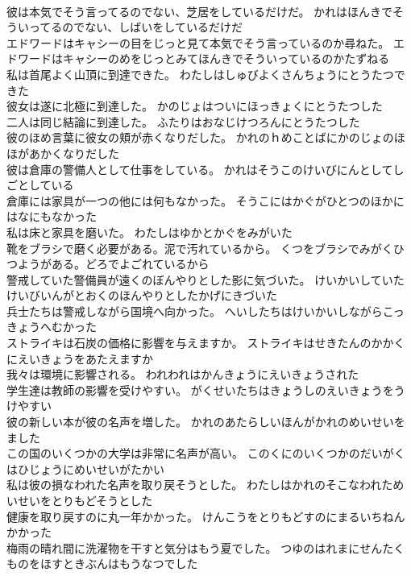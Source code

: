 \documentclass[8pt]{extreport}
\begin{document}
\begin{CJK}{UTF8}{min}
\\	彼は本気でそう言ってるのでない、芝居をしているだけだ。	かれはほんきでそういってるのでない、しばいをしているだけだ 
\\	エドワードはキャシーの目をじっと見て本気でそう言っているのか尋ねた。	エドワードはキャシーのめをじっとみてほんきでそういっているのかたずねる 
\\	私は首尾よく山頂に到達できた。	わたしはしゅびよくさんちょうにとうたつできた 
\\	彼女は遂に北極に到達した。	かのじょはついにほっきょくにとうたつした 
\\	二人は同じ結論に到達した。	ふたりはおなじけつろんにとうたつした 
\\	彼のほめ言葉に彼女の頬が赤くなりだした。	かれのｈめことばにかのじょのほほがあかくなりだした 
\\	彼は倉庫の警備人として仕事をしている。	かれはそうこのけいびにんとしてしごとしている 
\\	倉庫には家具が一つの他には何もなかった。	そうこにはかぐがひとつのほかにはなにもなかった 
\\	私は床と家具を磨いた。	わたしはゆかとかぐをみがいた 
\\	靴をブラシで磨く必要がある。泥で汚れているから。	くつをブラシでみがくひつようがある。どろでよごれているから 
\\	警戒していた警備員が遠くのぼんやりとした影に気づいた。	けいかいしていたけいびいんがとおくのほんやりとしたかげにきづいた 
\\	兵士たちは警戒しながら国境へ向かった。	へいしたちはけいかいしながらこっきょうへむかった 
\\	ストライキは石炭の価格に影響を与えますか。	ストライキはせきたんのかかくにえいきょうをあたえますか 
\\	我々は環境に影響される。	われわれはかんきょうにえいきょうされた 
\\	学生達は教師の影響を受けやすい。	がくせいたちはきょうしのえいきょうをうけやすい 
\\	彼の新しい本が彼の名声を増した。	かれのあたらしいほんがかれのめいせいをました 
\\	この国のいくつかの大学は非常に名声が高い。	このくにのいくつかのだいがくはひじょうにめいせいがたかい 
\\	私は彼の損なわれた名声を取り戻そうとした。	わたしはかれのそこなわれためいせいをとりもどそうとした 
\\	健康を取り戻すのに丸一年かかった。	けんこうをとりもどすのにまるいちねんかかった 
\\	梅雨の晴れ間に洗濯物を干すと気分はもう夏でした。	つゆのはれまにせんたくものをほすときぶんはもうなつでした 

\end{CJK}
\end{document}
